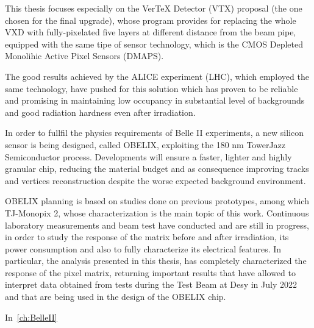 This thesis focuses especially on the VerTeX Detector (VTX) proposal (the one chosen for the final upgrade), whose program provides for replacing the whole VXD with fully-pixelated five layers at different distance from the beam pipe, equipped with the same tipe of sensor technology, which is the CMOS Depleted Monolihic Active Pixel Sensors (DMAPS). 

The good results achieved by the ALICE experiment (LHC), which employed the same technology, have pushed for this solution which has proven to be reliable and promising in maintaining low occupancy in substantial level of backgrounds and good radiation hardness even after irradiation. 

In order to fullfil the physics requirements of Belle II experiments, a new silicon sensor is being designed, called OBELIX, exploiting the 180 nm TowerJazz Semiconductor process. Developments will ensure a faster, lighter and highly granular chip, reducing the material budget and as consequence improving tracks and vertices reconstruction despite the worse expected background environment. 

OBELIX planning is based on studies done on previous prototypes, among which TJ-Monopix 2, whose characterization is the main topic of this work. Continuous laboratory measurements and beam test have conducted and are still in progress, in order to study the response of the matrix before and after irradiation, its power consumption and also to fully characterize its electrical features. 
In particular, the analysis presented in this thesis, has completely characterized the response of the pixel matrix, returning important results that have allowed to interpret data obtained from tests during the Test Beam at Desy in July 2022 and that are being used in the design of the OBELIX chip.

In~\autoref{ch:BelleII}



